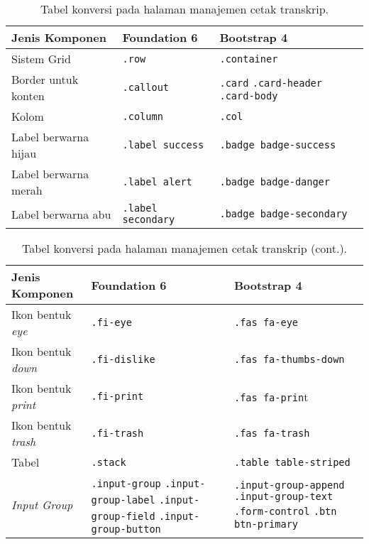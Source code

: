 \begin{table}[H]
	\caption{Tabel konversi pada halaman manajemen cetak transkrip.}
	\begin{tabular}{| p{} | p{} | p{} |} 
		\hline
		\textbf{Jenis Komponen} & \textbf{Foundation 6} & \textbf{Bootstrap 4}  \\ [0.5ex] 
		\hline	
		Sistem Grid & \texttt{.row} &   \texttt{.container} \\ 
		\hline	
		Border untuk konten & \texttt{.callout} &  \texttt{.card} \newline \texttt{.card-header} \newline \texttt{.card-body} \\
		\hline
		Kolom & \texttt{.column} &  \texttt{.col} \\	
		\hline	
		Label berwarna hijau & \texttt{.label success} &  \texttt{.badge badge-success} \\
		\hline	
		Label berwarna merah &\texttt{.label alert} & \texttt{.badge badge-danger}  \\
		\hline	
		Label berwarna abu & \texttt{.label secondary} & \texttt{.badge badge-secondary}  \\
		\hline	
	\end{tabular}
\end{table}

\begin{table}[H] \ContinuedFloat
	\caption{Tabel konversi pada halaman manajemen cetak transkrip (cont.).}
	\begin{tabular}{| p{} | p{} | p{} |} 
		\hline
		\textbf{Jenis Komponen} & \textbf{Foundation 6} & \textbf{Bootstrap 4}  \\ [0.5ex] 
		\hline	
		Ikon bentuk \textit{eye} & \texttt{.fi-eye} &  \texttt{.fas fa-eye} \\	
		\hline	
		Ikon bentuk \textit{down} & \texttt{.fi-dislike} &  \texttt{.fas fa-thumbs-down} \\	
		\hline
		Ikon bentuk \textit{print} & \texttt{.fi-print} &  \texttt{.fas fa-prin}t \\	
		\hline
		Ikon bentuk \textit{trash} & \texttt{.fi-trash} &  \texttt{.fas fa-trash} \\	
		\hline
		Tabel & \texttt{.stack} & \texttt{.table table-striped}  \\
		\hline	
		\textit{Input Group} & \texttt{.input-group} \newline \texttt{.input-group-label} \newline \texttt{.input-group-field} \newline \texttt{.input-group-button} & \texttt{.input-group-append} \newline \texttt{.input-group-text} \newline \texttt{.form-control} \newline \texttt{.btn btn-primary} \\[1ex]
		\hline	
	\end{tabular}
	\label{table:konversiManajemenCetakTranskrip}
\end{table}


